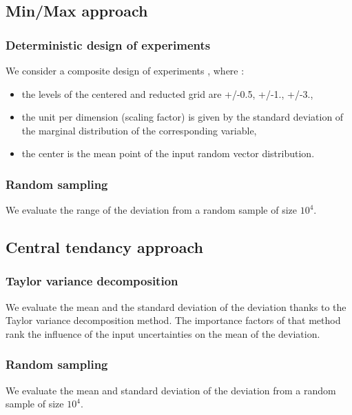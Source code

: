 \documentclass[11pt]{article}
\begin{document}
\subsection{Min/Max approach}


\subsubsection{Deterministic design of experiments }

We consider a composite design of experiments , where :
\begin{itemize}
\item the levels of the centered and reducted grid are +/-0.5, +/-1., +/-3.,
\item the unit per dimension (scaling factor) is given by the standard deviation of the marginal distribution of the corresponding variable,
\item the center is the mean point of the input random vector distribution.
\end{itemize}



\subsubsection{Random sampling}

We evaluate the range of the deviation from a random sample of size $10^4$.



\subsection{Central tendancy approach}


\subsubsection{Taylor variance decomposition}

We evaluate the mean and the standard deviation of the deviation thanks to the Taylor variance decomposition method. The importance factors of that method rank the influence of the input uncertainties on the mean of the deviation.

\subsubsection{Random sampling}

We evaluate the mean and standard deviation of the deviation from a random sample of size $10^4$.
\end{document}
